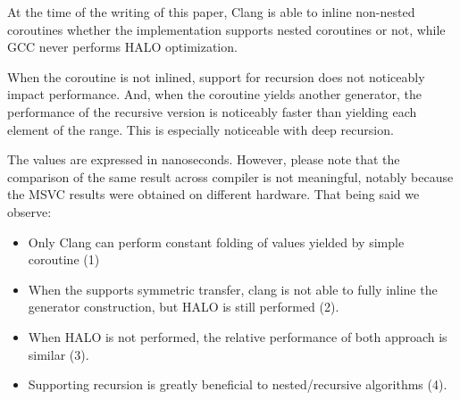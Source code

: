 \documentclass{wg21}
\begin{document}
At the time of the writing of this paper, Clang is able to inline non-nested coroutines whether the implementation
supports nested coroutines or not, while GCC never performs HALO optimization.

When the coroutine is not inlined, support for recursion does not noticeably impact performance.
And, when the coroutine yields another generator, the performance of the recursive version is noticeably faster than
yielding each element of the range. This is especially noticeable with deep recursion.



The values are expressed in nanoseconds. However, please note that the comparison of the same result across compiler is not meaningful, notably because the MSVC results were obtained on different hardware.
That being said we observe:

\begin{itemize}
    \item Only Clang can perform constant folding of values yielded by simple coroutine (1)
    \item When the  supports symmetric transfer, clang is not able to fully inline the generator construction, but HALO is still performed (2).
    \item When HALO is not performed, the relative performance of both approach is similar (3).
    \item Supporting recursion is greatly beneficial to nested/recursive algorithms (4).
\end{itemize}
\end{document}
